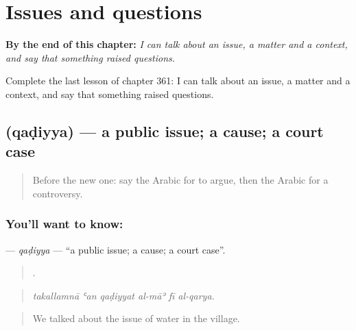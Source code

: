 
\chapter{Issues and questions}
\label{ch:ar-issues-and-questions}

\begin{chapteropening}
\textbf{By the end of this chapter:} \emph{I can talk about an issue, a matter and a context, and say that something raised questions.}

Complete the last lesson of chapter 361: I can talk about an issue, a matter and a context, and say that something raised questions.
\end{chapteropening}

\section[\texorpdfstring{\ar{قضية} (qaḍiyya)}{قضية (qaḍiyya)}]{ (qaḍiyya) — a public issue; a cause; a court case}

\label{lesson:AR-C361-qadiyya}



\begin{quote}
Before the new one: say the Arabic for to argue, then the Arabic for a controversy.
\end{quote}

\subsection*{You'll want to know: }
\textbf{} — \emph{qaḍiyya} — \textquotedblleft{}a public issue; a cause; a court case\textquotedblright{}.

\begin{quote}
     .
\end{quote}

\begin{quote}
\emph{takallamnā ʿan qaḍiyyat al-māʾ fī al-qarya.}
\end{quote}

\begin{quote}
We talked about the issue of water in the village.
\end{quote}

